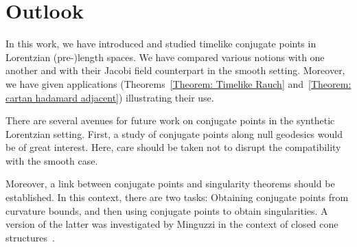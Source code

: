 \documentclass[a4paper,11pt]{article}
\numberwithin{equation}{section}
\theoremstyle{plain}
\theoremstyle{definition}
\begin{document}
\section{Outlook}
\label{section: Outlook}

In this work, we have introduced and studied timelike conjugate points in Lorentzian (pre-)length spaces. We have compared various notions with one another and with their Jacobi field counterpart in the smooth setting. Moreover, we have given applications (Theorems~\ref{Theorem: Timelike Rauch} and~\ref{Theorem: cartan hadamard adjacent}) illustrating their use.

There are several avenues for future work on conjugate points in the synthetic Lorentzian setting. First, a study of conjugate points along null geodesics would be of great interest. Here, care should be taken not to disrupt the compatibility with the smooth case. 

Moreover, a link between conjugate points and singularity theorems should be established. In this context, there are two tasks: Obtaining conjugate points from curvature bounds, and then using conjugate points to obtain singularities. A version of the latter was investigated by Minguzzi in the context of closed cone structures~\cite{minguzzi2019causality}.
\end{document}
